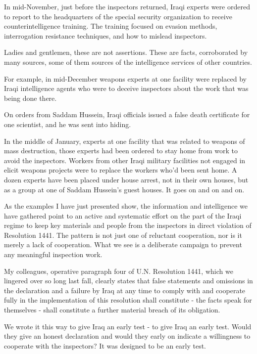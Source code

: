 \documentclass[10pt,a4paper]{article}
\begin{document}
In mid-November, just before the inspectors returned, Iraqi experts were ordered to report to the headquarters of the special security organization to receive counterintelligence training. The training focused on evasion methods, interrogation resistance techniques, and how to mislead inspectors.

Ladies and gentlemen, these are not assertions. These are facts, corroborated by many sources, some of them sources of the intelligence services of other countries.

For example, in mid-December weapons experts at one facility were replaced by Iraqi intelligence agents who were to deceive inspectors about the work that was being done there.

On orders from Saddam Hussein, Iraqi officials issued a false death certificate for one scientist, and he was sent into hiding.

In the middle of January, experts at one facility that was related to weapons of mass destruction, those experts had been ordered to stay home from work to avoid the inspectors. Workers from other Iraqi military facilities not engaged in elicit weapons projects were to replace the workers who'd been sent home. A dozen experts have been placed under house arrest, not in their own houses, but as a group at one of Saddam Hussein's guest houses. It goes on and on and on.

As the examples I have just presented show, the information and intelligence we have gathered point to an active and systematic effort on the part of the Iraqi regime to keep key materials and people from the inspectors in direct violation of Resolution 1441. The pattern is not just one of reluctant cooperation, nor is it merely a lack of cooperation. What we see is a deliberate campaign to prevent any meaningful inspection work.

My colleagues, operative paragraph four of U.N. Resolution 1441, which we lingered over so long last fall, clearly states that false statements and omissions in the declaration and a failure by Iraq at any time to comply with and cooperate fully in the implementation of this resolution shall constitute - the facts speak for themselves - shall constitute a further material breach of its obligation.

We wrote it this way to give Iraq an early test - to give Iraq an early test. Would they give an honest declaration and would they early on indicate a willingness to cooperate with the inspectors? It was designed to be an early test.
\end{document}
